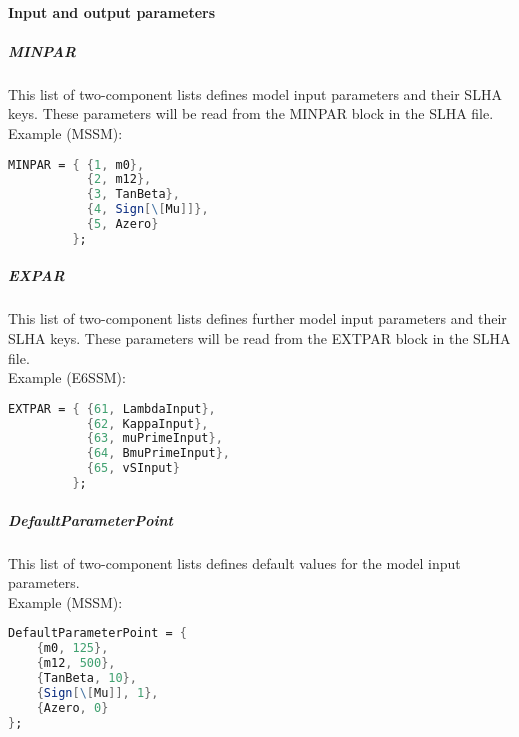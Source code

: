 \paragraph{Input and output parameters}

\subparagraph{MINPAR} This list of two-component lists defines model
input parameters and their SLHA keys.  These parameters will be read
from the MINPAR block in the SLHA file.
\\
Example (MSSM):
\begin{lstlisting}[language=Mathematica]
MINPAR = { {1, m0},
           {2, m12},
           {3, TanBeta},
           {4, Sign[\[Mu]]},
           {5, Azero}
         };
\end{lstlisting}

\subparagraph{EXPAR} This list of two-component lists defines further
model input parameters and their SLHA keys.  These parameters will be
read from the EXTPAR block in the SLHA file.
\\
Example (E6SSM):
\begin{lstlisting}[language=Mathematica]
EXTPAR = { {61, LambdaInput},
           {62, KappaInput},
           {63, muPrimeInput},
           {64, BmuPrimeInput},
           {65, vSInput}
         };
\end{lstlisting}

\subparagraph{DefaultParameterPoint} This list of two-component lists
defines default values for the model input parameters.
\\
Example (MSSM):
\begin{lstlisting}[language=Mathematica]
DefaultParameterPoint = {
    {m0, 125},
    {m12, 500},
    {TanBeta, 10},
    {Sign[\[Mu]], 1},
    {Azero, 0}
};
\end{lstlisting}

